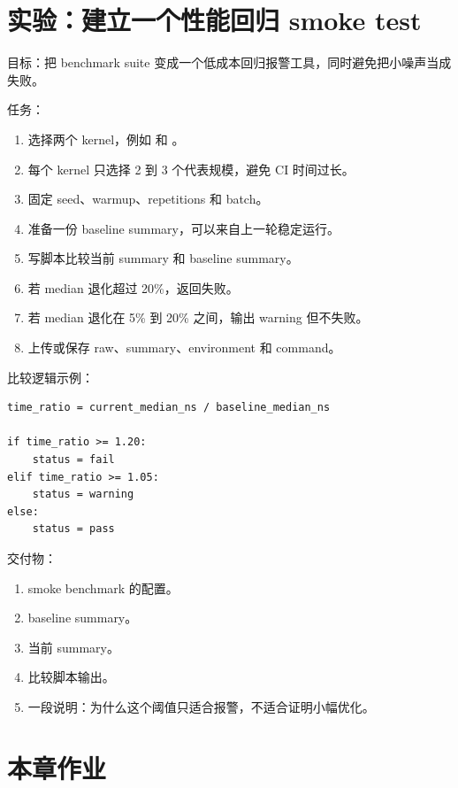 \section{实验：建立一个性能回归 smoke test}

\begin{labbox}
目标：把 benchmark suite 变成一个低成本回归报警工具，同时避免把小噪声当成失败。

任务：

\begin{enumerate}
  \item 选择两个 kernel，例如  和 。
  \item 每个 kernel 只选择 2 到 3 个代表规模，避免 CI 时间过长。
  \item 固定 seed、warmup、repetitions 和 batch。
  \item 准备一份 baseline summary，可以来自上一轮稳定运行。
  \item 写脚本比较当前 summary 和 baseline summary。
  \item 若 median 退化超过 20\%，返回失败。
  \item 若 median 退化在 5\% 到 20\% 之间，输出 warning 但不失败。
  \item 上传或保存 raw、summary、environment 和 command。
\end{enumerate}

比较逻辑示例：

\begin{lstlisting}
time_ratio = current_median_ns / baseline_median_ns

if time_ratio >= 1.20:
    status = fail
elif time_ratio >= 1.05:
    status = warning
else:
    status = pass
\end{lstlisting}

交付物：

\begin{enumerate}
  \item smoke benchmark 的配置。
  \item baseline summary。
  \item 当前 summary。
  \item 比较脚本输出。
  \item 一段说明：为什么这个阈值只适合报警，不适合证明小幅优化。
\end{enumerate}
\end{labbox}

\section{本章作业}


